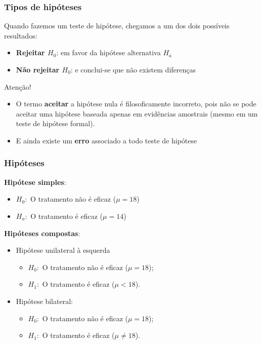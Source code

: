 \documentclass{beamer}
\begin{document}
\begin{frame}
\frametitle{Tipos de hipóteses}

Quando fazemos um teste de hipótese, chegamos a um dos dois possíveis
resultados:

\begin{itemize}
\item
  \textbf{Rejeitar \(H_0\)}: em favor da hipótese alternativa \(H_a\)
\item
  \textbf{Não rejeitar \(H_0\)}: e conclui-se que não existem diferenças
\end{itemize}

\begin{block}{Atenção!}

\begin{itemize}
\item
  O termo \textbf{aceitar} a hipótese nula é filosoficamente incorreto,
  pois não se pode aceitar uma hipótese baseada apenas em evidências
  amostrais (mesmo em um teste de hipótese formal).
\item
  E ainda existe um \textbf{erro} associado a todo teste de hipótese
\end{itemize}
\end{block}
\end{frame}

\begin{frame}
\frametitle{Hipóteses}

\textbf{Hipótese simples}:

\begin{itemize}
\item
  \(H_0:\) O tratamento não é eficaz (\(\mu = 18\))
\item
  \(H_a:\) O tratamento é eficaz (\(\mu = 14\))
\end{itemize}

\textbf{Hipóteses compostas}:

\begin{itemize}
\item
  Hipótese unilateral à esquerda

  \begin{itemize}
  \item
    \(H_0:\) O tratamento não é eficaz (\(\mu = 18\));
  \item
    \(H_1:\) O tratamento é eficaz (\(\mu < 18\)).
  \end{itemize}
\item
  Hipótese bilateral:

  \begin{itemize}
  \item
    \(H_0:\) O tratamento não é eficaz (\(\mu = 18\));
  \item
    \(H_1:\) O tratamento é eficaz (\(\mu \neq 18\)).
  \end{itemize}
\end{itemize}
\end{frame}
\end{document}
